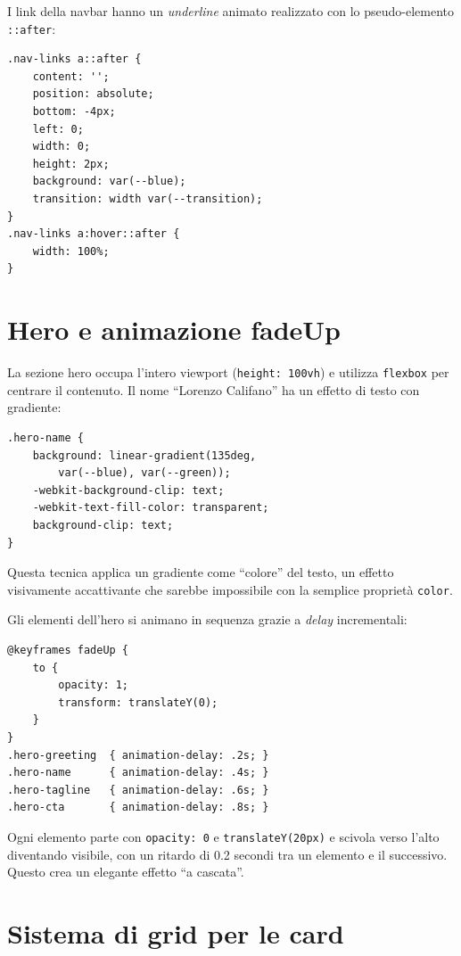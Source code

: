 \documentclass[a4paper,12pt]{report}
\begin{document}
I link della navbar hanno un \textit{underline} animato realizzato con lo pseudo-elemento \texttt{::after}:

\begin{lstlisting}[style=cssstyle, caption={Animazione underline dei link}]
.nav-links a::after {
    content: '';
    position: absolute;
    bottom: -4px;
    left: 0;
    width: 0;
    height: 2px;
    background: var(--blue);
    transition: width var(--transition);
}
.nav-links a:hover::after {
    width: 100%;
}
\end{lstlisting}

\section{Hero e animazione fadeUp}

La sezione hero occupa l'intero viewport (\texttt{height: 100vh}) e utilizza \texttt{flexbox} per centrare il contenuto. Il nome ``Lorenzo Califano'' ha un effetto di testo con gradiente:

\begin{lstlisting}[style=cssstyle, caption={Testo con gradiente}]
.hero-name {
    background: linear-gradient(135deg,
        var(--blue), var(--green));
    -webkit-background-clip: text;
    -webkit-text-fill-color: transparent;
    background-clip: text;
}
\end{lstlisting}

Questa tecnica applica un gradiente come ``colore'' del testo, un effetto visivamente accattivante che sarebbe impossibile con la semplice propriet\`a \texttt{color}.

Gli elementi dell'hero si animano in sequenza grazie a \textit{delay} incrementali:

\begin{lstlisting}[style=cssstyle, caption={Animazione staggered}]
@keyframes fadeUp {
    to {
        opacity: 1;
        transform: translateY(0);
    }
}
.hero-greeting  { animation-delay: .2s; }
.hero-name      { animation-delay: .4s; }
.hero-tagline   { animation-delay: .6s; }
.hero-cta       { animation-delay: .8s; }
\end{lstlisting}

Ogni elemento parte con \texttt{opacity: 0} e \texttt{translateY(20px)} e scivola verso l'alto diventando visibile, con un ritardo di 0.2 secondi tra un elemento e il successivo. Questo crea un elegante effetto ``a cascata''.

\section{Sistema di grid per le card}
\end{document}
